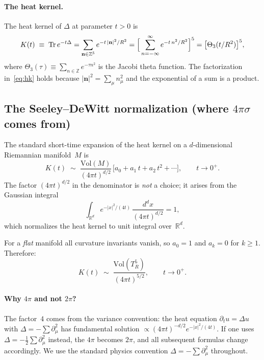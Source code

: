 \paragraph{The heat kernel.}
The heat kernel of $\Delta$ at parameter $t > 0$ is
\begin{equation}\label{eq:hk}
  K(t) \;\equiv\; \mathrm{Tr}\,e^{-t\Delta}
  = \sum_{\mathbf{n}\in\mathbb{Z}^5} e^{-t\,|\mathbf{n}|^2/R^2}
  = \Bigl[\,\sum_{n=-\infty}^{\infty} e^{-t\,n^2/R^2}\Bigr]^5
  = \bigl[\Theta_3(t/R^2)\bigr]^5,
\end{equation}
where $\Theta_3(\tau) \equiv \sum_{n\in\mathbb{Z}} e^{-\tau n^2}$
is the Jacobi theta function.
The factorization in~\eqref{eq:hk} holds because
$|\mathbf{n}|^2 = \sum_\mu n_\mu^2$ and the exponential of a sum is
a product.

\subsection{The Seeley--DeWitt normalization (where $4\pi\sigma$ comes from)}

The standard short-time expansion of the heat kernel on a
$d$-dimensional Riemannian manifold~$M$ is
\begin{equation}\label{eq:sdw}
  K(t) \;\sim\; \frac{\mathrm{Vol}(M)}{(4\pi t)^{d/2}}
  \,\bigl[a_0 + a_1\,t + a_2\,t^2 + \cdots\bigr],
  \qquad t \to 0^+.
\end{equation}
The factor $(4\pi t)^{d/2}$ in the denominator is \emph{not} a choice;
it arises from the Gaussian integral
\begin{equation}\label{eq:gaussian}
  \int_{\mathbb{R}^d} e^{-|x|^2/(4t)}\,\frac{d^d x}{(4\pi t)^{d/2}} = 1,
\end{equation}
which normalizes the heat kernel to unit integral over~$\mathbb{R}^d$.

For a \emph{flat} manifold all curvature invariants vanish, so $a_0=1$
and $a_k=0$ for $k\geq 1$. Therefore:
\begin{equation}\label{eq:flat}
  K(t) \;\sim\; \frac{\mathrm{Vol}(T^5_R)}{(4\pi t)^{5/2}},
  \qquad t \to 0^+.
\end{equation}

\paragraph{Why $4\pi$ and not $2\pi$?}
The factor~$4$ comes from the variance convention: the heat equation
$\partial_t u = \Delta u$ with $\Delta = -\sum\partial_\mu^2$ has
fundamental solution $\propto (4\pi t)^{-d/2} e^{-|x|^2/(4t)}$.
If one uses $\Delta = -\frac{1}{2}\sum\partial_\mu^2$ instead, the
$4\pi$ becomes $2\pi$, and all subsequent formulas change accordingly.
We use the standard physics convention $\Delta=-\sum\partial_\mu^2$
throughout.

